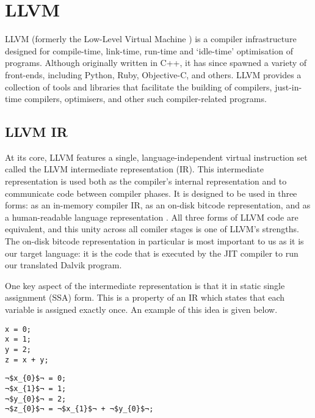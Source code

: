 \section{LLVM}
\label{sec:llvm}

LLVM (formerly the Low-Level Virtual Machine \cite{llvm_name}) is a compiler infrastructure designed for compile-time, link-time, run-time and `idle-time' optimisation of programs.  Although originally written in C++, it has since spawned a variety of front-ends, including Python, Ruby, Objective-C, and others. LLVM provides a collection of tools and libraries that facilitate the building of compilers, just-in-time compilers, optimisers, and other such compiler-related programs.

\subsection*{LLVM IR}

At its core, LLVM features a single, language-independent virtual instruction set called the LLVM intermediate representation (IR). This intermediate representation is used both as the compiler's internal representation and to communicate code between compiler phases. It is designed to be used in three forms: as an in-memory compiler IR, as an on-disk bitcode representation, and as a human-readable language representation \cite{llvm_ref}. All three forms of LLVM code are equivalent, and this unity across all comiler stages is one of LLVM's strengths. The on-disk bitcode representation in particular is most important to us as it is our target language: it is the code that is executed by the JIT compiler to run our translated Dalvik program.

One key aspect of the intermediate representation is that it in static single assignment (SSA) form. This is a property of an IR which states that each variable is assigned exactly once. An example of this idea is given below.

\lstset{
	language=C,
	basicstyle=\small,
	stringstyle=\ttfamily
}

\begin{lstlisting}[frame=single, caption={Code for SSA example}, label=lst:ssa_1]
x = 0;
x = 1;
y = 2;
z = x + y;
\end{lstlisting}

\newpage

\begin{lstlisting}[frame=single, escapechar={¬}, caption={Example of SSA form}, label=lst:ssa_2]
¬$x_{0}$¬ = 0;
¬$x_{1}$¬ = 1;
¬$y_{0}$¬ = 2;
¬$z_{0}$¬ = ¬$x_{1}$¬ + ¬$y_{0}$¬;
\end{lstlisting}

